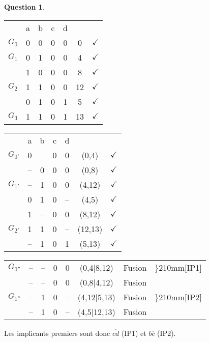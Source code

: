 \documentclass[11pt,a4paper]{article}
\theoremstyle{definition}%
\newtheorem{Q}{Question}[] %
\begin{document}
\begin{Q}
\begin{enumerate}
{		\begin{minipage}{0.5\textwidth}
			\begin{tabular}{ccccccc}
			 & a & b & c & d & & \\
			 $G_0$ & 0 & 0 & 0 & 0 & 0 & $\checkmark$ \\ \hline
			 $G_1$ & 0 & 1 & 0 & 0 & 4 & $\checkmark$ \\
			 & 1 & 0 & 0 & 0 & 8 & $\checkmark$ \\ \hline
			 $G_2$ & 1 & 1 & 0 & 0 & 12 & $\checkmark$ \\
			 & 0 & 1 & 0 & 1 & 5 & $\checkmark$ \\ \hline
			 $G_3$ & 1 & 1 & 0 & 1 & 13 & $\checkmark$ \\
			\end{tabular}
		\end{minipage}%
		\begin{minipage}{0.5\textwidth}
			\begin{tabular}{ccccccc}
			 & a & b & c & d & & \\
			 $G_{0'}$ & 0 & -- & 0 & 0 & (0,4) & $\checkmark$ \\
			 & -- & 0 & 0 & 0 & (0,8) & $\checkmark$ \\ \hline
			 $G_{1'}$ & -- & 1 & 0 & 0 & (4,12) & $\checkmark$ \\
			 & 0 & 1 & 0 & -- & (4,5) & $\checkmark$ \\
			 & 1 & -- & 0 & 0 & (8,12) & $\checkmark$ \\ \hline
			 $G_{2'}$ & 1 & 1 & 0 & -- & (12,13) & $\checkmark$ \\
			 & -- & 1 & 0 & 1 & (5,13) & $\checkmark$ \\
			\end{tabular}
		\end{minipage}
		\begin{center}
			\begin{tabular}{cccccccc}
			$G_{0''}$ & -- & -- & 0 & 0 & (0,4|8,12) & Fusion & \rdelim\}{2}{10mm}[IP1] \\
			& -- & -- & 0 & 0 & (0,8|4,12) & Fusion \\ \hline
			$G_{1''}$ & -- & 1 & 0 & -- & (4,12|5,13) & Fusion & \rdelim\}{2}{10mm}[IP2] \\
			& -- & 1 & 0 & -- & (4,5|12,13) & Fusion \\
			\end{tabular}
		\end{center}

		Les implicants premiers sont donc $\overline{cd}$ (IP1) et $b\overline{c}$ (IP2).
	}


\end{enumerate}
\end{Q}
\end{document}

